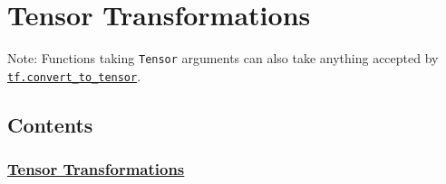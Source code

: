 

\section{Tensor Transformations }\label{tensor-transformations}

Note: Functions taking \lstinline{Tensor} arguments can also take anything
accepted by
\href{../../api_docs/python/framework.md\#convert_to_tensor}{\lstinline{tf.convert_to_tensor}}.

\subsection{Contents}\label{contents}

\subsubsection{\texorpdfstring{\protect\hyperlink{AUTOGENERATED-tensor-transformations}{Tensor
Transformations}}{Tensor Transformations}}\label{tensor-transformations-1}

